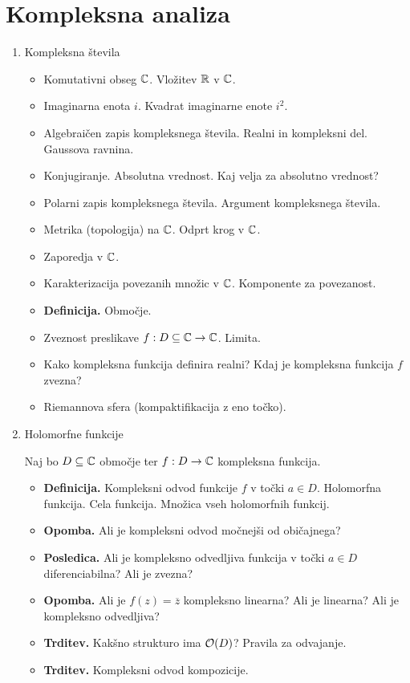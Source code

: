 \section{Kompleksna analiza}

\begin{enumerate}
    \item Kompleksna števila    
    \begin{itemize}
        \item Komutativni obseg \(\mathbb{C}\). Vložitev \(\mathbb{R}\) v \(\mathbb{C}\).
        \item Imaginarna enota \(i\). Kvadrat imaginarne enote \(i^2\).
        \item Algebraičen zapis kompleksnega števila. Realni in kompleksni del. Gaussova ravnina.
        \item Konjugiranje. Absolutna vrednost. Kaj velja za absolutno vrednost?
        \item Polarni zapis kompleksnega števila. Argument kompleksnega števila.
        \item Metrika (topologija) na \(\mathbb{C}\). Odprt krog v \(\mathbb{C}\).
        \item Zaporedja v \(\mathbb{C}\).
        \item Karakterizacija povezanih množic v \(\mathbb{C}\). Komponente za povezanost.
        \item \textbf{Definicija.} Območje.
        \item Zveznost preslikave \(f: D \subseteq \mathbb{C} \to \mathbb{C}\). Limita.
        \item Kako kompleksna funkcija definira realni? Kdaj je kompleksna funkcija \(f\) zvezna?
        \item Riemannova sfera (kompaktifikacija z eno točko).
    \end{itemize}

    \item Holomorfne funkcije
    
    Naj bo \(D \subseteq \mathbb{C}\) območje ter \(f: D \to \mathbb{C}\) kompleksna funkcija.
    \begin{itemize}
        \item \textbf{Definicija.} Kompleksni odvod funkcije \(f\) v točki \(a \in D\). Holomorfna funkcija. Cela funkcija. Množica vseh holomorfnih funkcij. 
        \item \textbf{Opomba.} Ali je kompleksni odvod močnejši od običajnega?
        \item \textbf{Posledica.} Ali je kompleksno odvedljiva funkcija v točki \(a \in D\) diferenciabilna? Ali je zvezna?
        \item \textbf{Opomba.} Ali je \(f(z) = \overline{z}\) kompleksno linearna? Ali je linearna? Ali je kompleksno odvedljiva?
        \item \textbf{Trditev.} Kakšno strukturo ima \(\mathcal{O}(D)\)? Pravila za odvajanje.
        \item \textbf{Trditev.} Kompleksni odvod kompozicije.
    \end{itemize}


\end{enumerate}
